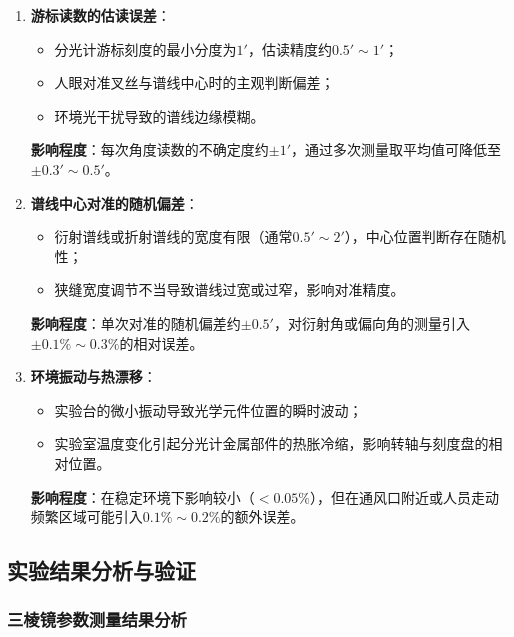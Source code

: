 \documentclass[11pt]{article}
\begin{document}
\begin{enumerate}
    \item \textbf{游标读数的估读误差}：
    \begin{itemize}
        \item 分光计游标刻度的最小分度为$1'$，估读精度约$0.5' \sim 1'$；
        \item 人眼对准叉丝与谱线中心时的主观判断偏差；
        \item 环境光干扰导致的谱线边缘模糊。
    \end{itemize}
    \textbf{影响程度}：每次角度读数的不确定度约$\pm 1'$，通过多次测量取平均值可降低至$\pm 0.3' \sim 0.5'$。
    
    \item \textbf{谱线中心对准的随机偏差}：
    \begin{itemize}
        \item 衍射谱线或折射谱线的宽度有限（通常$0.5' \sim 2'$），中心位置判断存在随机性；
        \item 狭缝宽度调节不当导致谱线过宽或过窄，影响对准精度。
    \end{itemize}
    \textbf{影响程度}：单次对准的随机偏差约$\pm 0.5'$，对衍射角或偏向角的测量引入$\pm 0.1\% \sim 0.3\%$的相对误差。
    
    \item \textbf{环境振动与热漂移}：
    \begin{itemize}
        \item 实验台的微小振动导致光学元件位置的瞬时波动；
        \item 实验室温度变化引起分光计金属部件的热胀冷缩，影响转轴与刻度盘的相对位置。
    \end{itemize}
    \textbf{影响程度}：在稳定环境下影响较小（$< 0.05\%$），但在通风口附近或人员走动频繁区域可能引入$0.1\% \sim 0.2\%$的额外误差。
\end{enumerate}

\subsection{实验结果分析与验证}

\subsubsection{三棱镜参数测量结果分析}
\end{document}
